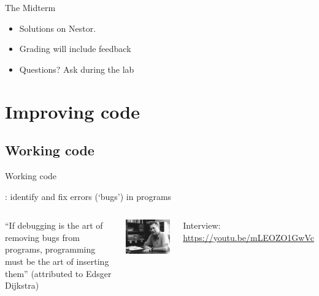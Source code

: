\documentclass[aspectratio=169,usenames,dvipsnames]{beamer}
\begin{document}
\begin{frame}{The Midterm}
    \begin{itemize}
        \item Solutions on Nestor.
		\item Grading will include feedback
        \item Questions? Ask during the lab
    \end{itemize}
\end{frame}

\section{Improving code}
\subsection{Working code}
\frame{\tableofcontents[currentsection]}
\begin{frame}{Working code}
    \begin{definition}
        : identify and fix errors (`bugs') in programs
    \end{definition}

    \pause\vspace{1em}
    \begin{columns}
            ``If debugging is the art of removing bugs from programs,
            programming must be the art of inserting them''
            (attributed to Edsger Dijkstra)

            \includegraphics[height=0.5\textheight]{fig/dijkstra}

            \vspace{1em}
            Interview: \url{https://youtu.be/mLEOZO1GwVc}
    \end{columns}
\end{frame}
\end{document}
